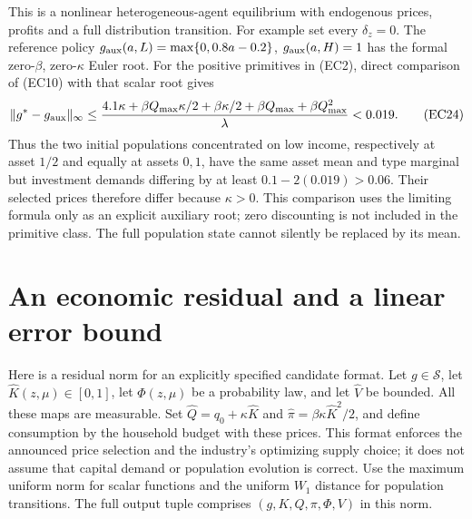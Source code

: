 \documentclass[11pt,a4paper]{article}
\begin{document}
This is a nonlinear heterogeneous-agent equilibrium with endogenous prices,
profits and a full distribution transition. For example set every
$\delta_z=0$. The reference policy
$g_{\rm aux}(a,L)=\max\{0,0.8a-0.2\}$, $g_{\rm aux}(a,H)=1$ has the formal
zero-$\beta$, zero-$\kappa$ Euler root. For the positive primitives in
\textup{(EC2)}, direct comparison of \textup{(EC10)} with that scalar
root gives
\[
 \|g^*-g_{\rm aux}\|_\infty
 \leq\frac{4.1\kappa+\beta Q_{\max}\kappa/2+
                  \beta\kappa/2+\beta Q_{\max}+\beta Q_{\max}^2}
                 {\lambda}<0.019.
 \tag{EC24}
\]
Thus the two initial populations concentrated on low income, respectively
at asset $1/2$ and equally at assets $0,1$, have the same asset mean and
type marginal but investment demands differing by at least
$0.1-2(0.019)>0.06$. Their selected prices therefore differ because
$\kappa>0$. This comparison uses the limiting formula only as an explicit
auxiliary root; zero discounting is not included in the primitive class.
The full population state cannot silently be replaced by its mean.

\section{An economic residual and a linear error bound}
\label{sec:residual-stability}

Here is a residual norm for an explicitly specified candidate format.
Let $g\in\mathcal S$, let $\widehat K(z,\mu)\in[0,1]$, let
$\widehat\Phi(z,\mu)$ be a probability law, and let $\widehat V$ be
bounded. All these maps are measurable. Set
$\widehat Q=q_0+\kappa\widehat K$ and
$\widehat\pi=\beta\kappa\widehat K^2/2$, and define consumption by
the household budget with these prices. This format enforces the
announced price selection and the industry's optimizing supply choice;
it does not assume that capital demand or population evolution is correct.
Use the maximum uniform norm for scalar functions and the uniform $W_1$
distance for population transitions. The full output tuple comprises
$(g,K,Q,\pi,\Phi,V)$ in this norm.
\end{document}
